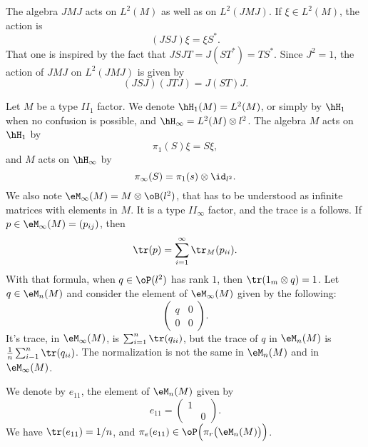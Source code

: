The algebra $JMJ$ acts on $L^2(M)$ as well as on $L^2(JMJ)$. If $\xi\in L^2(M)$, the action is
\begin{equation}		\label{EqActJMJLdM}
	(JSJ)\xi=\xi S^*.
\end{equation}
That one is inspired by the fact that $JSJT=J(ST^*)=TS^*$. Since $J^2=1$, the action of $JMJ$ on $L^2(JMJ)$ is given by
\begin{equation}		\label{EqActJMJLdJMJ}
	(JSJ)(JTJ)=J(ST)J.
\end{equation}

Let $M$ be a type $II_1$ factor. We denote $\hH_1(M)=L^2(M)$, or simply by $\hH_1$ when no confusion is possible, and $\hH_{\infty}=L^2(M)\otimes l^2$. The algebra $M$ acts on $\hH_1$ by
\begin{equation}
	\pi_1(S)\xi=S\xi,
\end{equation}
and $M$ acts on $\hH_{\infty}$ by
\begin{equation}
	\pi_{\infty}(S)=\pi_1(s)\otimes\id_{l^2}.
\end{equation}
We also note $\eM_{\infty}(M)=M\otimes\oB(l^2)$, that has to be understood as infinite matrices with elements in $M$. It is a type $II_{\infty}$ factor, and the trace is a follows. If $p\in\eM_{\infty}(M)=(p_{ij})$, then
\begin{equation}					\label{EqTraceMinfinuM}
	\tr(p)=\sum_{i=1}^{\infty}\tr_M(p_{ii}).
\end{equation}
With that formula, when $q\in\oP(l^2)$ has rank $1$, then $\tr(1_m\otimes q)=1$. Let $q\in\eM_n(M)$ and consider the element of $\eM_{\infty}(M)$ given by the following:
\begin{equation}
	\begin{pmatrix}
  q	&	0	\\ 
  0	&	0	
\end{pmatrix}.
\end{equation}
It's trace, in $\eM_{\infty}(M)$, is $\sum_{i=1}^n\tr(q_{ii})$, but the trace of $q$ in $\eM_n(M)$ is $\frac{1}{ n }\sum_{i-1}^n\tr(q_{ii})$. The normalization is not the same in $\eM_n(M)$ and in $\eM_{\infty}(M)$.

We denote by $e_{11}$, the element of $\eM_n(M)$ given by
\begin{equation}
	e_{11}=
\begin{pmatrix}
  1	&		\\ 
  	&	0	
\end{pmatrix}.
\end{equation}
We have $\tr(e_{11})=1/n$, and $\pi_e(e_{11})\in\oP\Big( \pi_r\big( \eM_n(M) \big) \Big)$.

